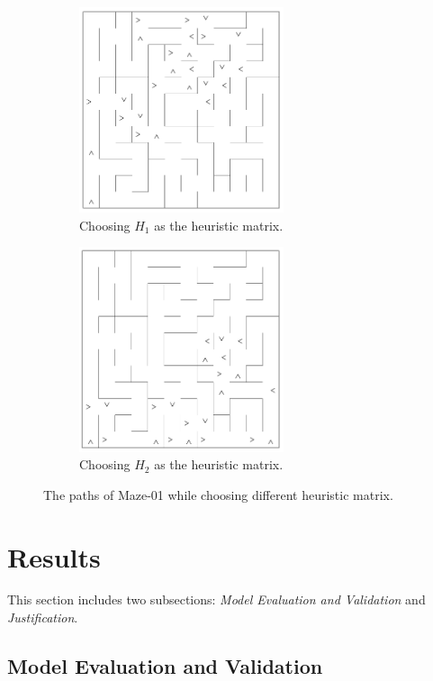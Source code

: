 \documentclass[11pt, oneside]{article}   	%
\begin{document}
\begin{figure}
\centering
\begin{subfigure}{7cm}
  \centering
  \includegraphics[width=6cm]{maze-01-astar-h1.png}
  \caption{Choosing $H_1$ as the heuristic matrix.}
  \label{fig:maze-01-h1}
\end{subfigure}%
\begin{subfigure}{7cm}
  \centering
  \includegraphics[width=6cm]{maze-01-astar-h2.png}
  \caption{Choosing $H_2$ as the heuristic matrix.}
  \label{fig:mae-01-h2}
\end{subfigure}
\caption{The paths of Maze-01 while choosing different heuristic matrix.}
\label{fig:different-H}
\end{figure}





\section{Results}
This section includes two subsections: {\it Model Evaluation and Validation} and {\it Justification}.
\subsection{Model Evaluation and Validation}
\end{document}
